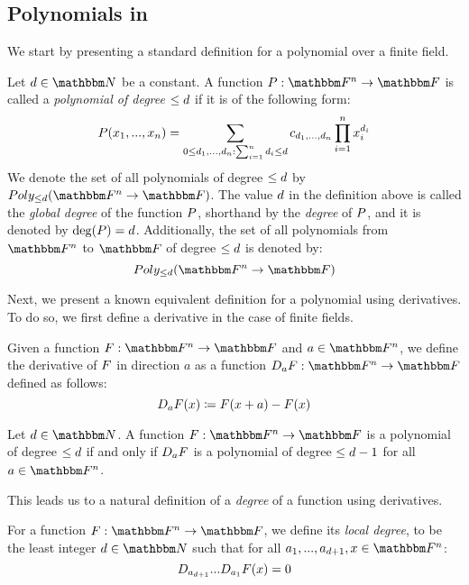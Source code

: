 \subsection[Polynomials in \titlefield]{Polynomials in \titlefield}\label{subsec:polynomials_in_Fn}
We start by presenting a standard definition for a polynomial over a finite field.
\begin{definition}
    Let $\degree \in \naturalnumbersset$ be a constant.
    A function $\funcdef{\genpoly}{\field}{\basefield}$ is called a \emph{polynomial of degree $\leq d$} if
    it is of the following form:
    \[
        \genpoly(x_1,...,x_{\blocklength}) =
            \sum_{0 \leq \degree_1,...,\degree_{n} : \sum_{i=1}^{\blocklength}{\degree_i} \leq \degree}
                {c_{\degree_1,...,\degree_n} \prod_{i=1}^{\blocklength} x_i^{\degree_i}}
    \]
    We denote the set of all polynomials of degree $\leq d$ by $\allpolyset{\leq \degree}{\field}{\basefield}$.
    The value $d$ in the definition above is called the \emph{global degree} of the function $\genpoly$, shorthand by the \emph{degree} of $\genpoly$,
    and it is denoted by $\deg(\genpoly) = \degree$.
    \newline
    Additionally, the set of all polynomials from $\field$ to $\basefield$ of degree $\leq d$ is denoted by:
    \[
        \allpolyset{\leq \degree}{\field}{\basefield}
    \]
\end{definition}
Next, we present a known equivalent definition for a polynomial using derivatives.
To do so, we first define a derivative in the case of finite fields.
\begin{definition}[Derivative]
    Given a function $\funcdef{\genfunc}{\field}{\basefield}$ and $a \in \field$,
    we define the derivative of $\genfunc$ in direction $a$ as a function $\funcdef{\directionderivative_{a}\genfunc}{\field}{\basefield}$
    defined as follows:
    \[
        \directionderivative_a \genfunc(x) \definedas \genfunc(x + a) - \genfunc(x)
    \]
\end{definition}
\begin{lemma}
    Let $\degree \in \naturalnumbersset$.
    A function $\funcdef{\genfunc}{\field}{\basefield}$ is a polynomial of degree $\leq d$
    if and only if $\directionderivative_{a}\genfunc$ is a polynomial of degree $\leq d - 1$ for all $a \in \field$.
\end{lemma}
This leads us to a natural definition of a \emph{degree} of a function using derivatives.
\begin{definition}
    For a function $\funcdef{\genfunc}{\field}{\basefield}$, we define its \emph{local degree},
    to be the least integer $\degree \in \naturalnumbersset$ such that
    for all $a_1,...,a_{\degree + 1}, x \in \field$:
    \[
        \directionderivative_{a_{\degree + 1}}...\directionderivative_{a_{1}} \genfunc(x) = 0
    \]
\end{definition}
